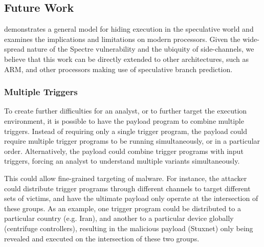 \subsection{Future Work}
\label{subsec:future-work}

\speculake demonstrates a general model for hiding execution in 
the speculative world and examines the implications and limitations on
modern processors. Given the wide-spread nature of the Spectre vulnerability 
and the ubiquity of side-channels, we believe that this work can 
be directly extended to other architectures, such as ARM, and other processors
making use of speculative branch prediction.

\subsubsection{Multiple Triggers}
To create further difficulties for an analyst, or to further target the
execution environment, it is possible to have the payload program to combine
multiple triggers. Instead of requiring only a single trigger program, the
payload could require multiple trigger programs to be running simultaneously, or
in a particular order. Alternatively, the payload could combine trigger programs
with input triggers, forcing an analyst to understand multiple variants
simultaneously.

This could allow fine-grained targeting of malware. For instance, the attacker
could distribute trigger programs through different channels to target different
sets of victims, and have the ultimate payload only operate at the intersection
of these groups. As an example, one trigger program could be distributed to a
particular country (e.g. Iran), and another to a particular device globally
(centrifuge controllers), resulting in the malicious payload (Stuxnet) only
being revealed and executed on the intersection of these two groups.




